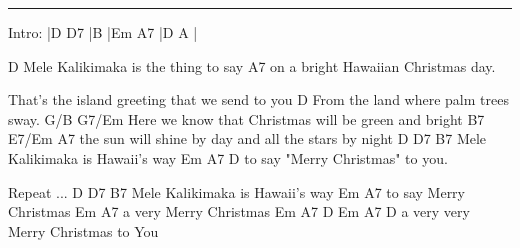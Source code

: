 \noindent\rule{\columnwidth}{1pt}

\begin{lstsong}
Intro:  |D  D7 |B  |Em A7 |D  A  |

D
Mele Kalikimaka is the thing to say
                               A7
on a bright Hawaiian Christmas day.
 
That's the island greeting that we send to you
                               D
From the land where palm trees sway.
G/B                                  G7/Em
Here we know that Christmas will be  green and bright
    B7                                E7/Em    A7
the sun will shine by day and all the stars by night
D                    D7     B7
Mele Kalikimaka is Hawaii's way
 Em         A7              D
to say "Merry Christmas" to you.

Repeat ...
D                    D7     B7
Mele Kalikimaka is Hawaii's way
 Em          A7
to say Merry Christmas
  Em         A7
a very Merry Christmas
  Em              A7            D    Em A7 D
a very very Merry Christmas  to You
\end{lstsong}
\newpage

